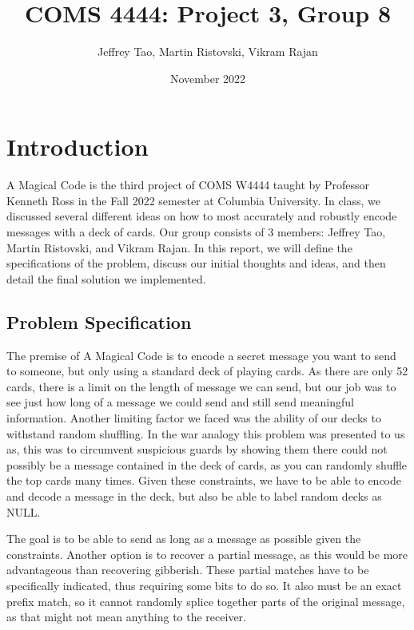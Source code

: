 \documentclass[titlepage]{article}
\title{COMS 4444: Project 3, Group 8}
\author{Jeffrey Tao, Martin Ristovski, Vikram Rajan}
\date{November 2022}
\begin{document}
\maketitle

\tableofcontents

\pagebreak

\section{Introduction}

A Magical Code is the third project of COMS W4444 taught by Professor Kenneth Ross in the Fall 2022 semester at Columbia University. In class, we discussed several different ideas on how to most accurately and robustly encode messages with a deck of cards. Our group consists of 3 members: Jeffrey Tao, Martin Ristovski, and Vikram Rajan. In this report, we will define the specifications of the problem, discuss our initial thoughts and ideas, and then detail the final solution we implemented. 

\subsection{Problem Specification}

The premise of A Magical Code is to encode a secret message you want to send to someone, but only using a standard deck of playing cards. As there are only 52 cards, there is a limit on the length of message we can send, but our job was to see just how long of a message we could send and still send meaningful information. Another limiting factor we faced was the ability of our decks to withstand random shuffling. In the war analogy this problem was presented to us as, this was to circumvent suspicious guards by showing them there could not possibly be a message contained in the deck of cards, as you can randomly shuffle the top cards many times. Given these constraints, we have to be able to encode and decode a message in the deck, but also be able to label random decks as NULL. 

The goal is to be able to send as long as a message as possible given the constraints. Another option is to recover a partial message, as this would be more advantageous than recovering gibberish. These partial matches have to be specifically indicated, thus requiring some bits to do so. It also must be an exact prefix match, so it cannot randomly splice together parts of the original message, as that might not mean anything to the receiver. 
\end{document}
